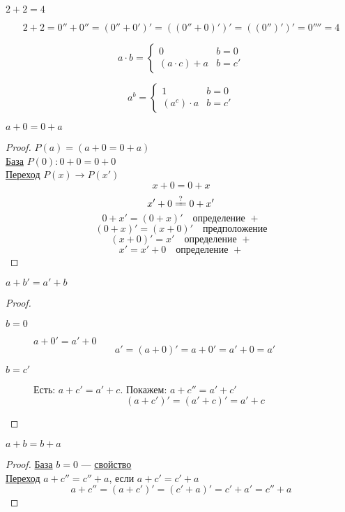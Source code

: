\documentclass[english]{article}
\begin{document}
\begin{task}
	\(2 + 2 = 4\)
\end{task}
\begin{solution}
	\[ 2 + 2 = 0'' + 0'' = (0'' + 0')' = ((0'' + 0)')' = ((0'')')' = 0'''' = 4 \]
\end{solution}
\begin{definition}
	\[ a \cdot b = \begin{cases}
			0               & b = 0  \\
			(a \cdot c) + a & b = c'
		\end{cases}\]
	\label{org75c396e}
\end{definition}
\begin{definition}
	\[ a^b = \begin{cases}
			1            & b = 0  \\
			(a^c)\cdot a & b = c'
		\end{cases}\]
	\label{org937b257}
\end{definition}
\beginproperty
\begin{property}
	\(a + 0 = 0 + a\)
	\label{orgd913f3c}
\end{property}
\begin{proof}
	\(P(a) = (a + 0 = 0 + a)\) \\
	\uline{База} \(P(0): 0 + 0 = 0 + 0\) \\
	\uline{Переход} \(P(x) \to P(x')\)
	\[ x + 0 = 0 + x \]
	\[ x' + 0 \xlongequal{?} 0 + x' \]
	\[ 0 + x' = (0 + x)' \quad\text{определение }+ \]
	\[ (0 + x)' = (x + 0)' \quad\text{предположение} \]
	\[ (x + 0)' = x' \quad\text{определение }+\]
	\[ x' = x' + 0 \quad\text{определение }+ \]
\end{proof}
\begin{property}
	\(a + b' = a' + b\)
\end{property}
\begin{proof}
	\-
	\begin{description}
		\item[{\(b = 0\)}] \(a + 0' = a' + 0\)
			\[ a' = (a + 0)' = a + 0' = a'+0 = a' \]
		\item[{\(b = c'\)}] Есть: \(a + c' = a' + c\). Покажем: \(a + c'' = a' + c'\)
			\[ (a + c')' = (a' + c)' = a' + c \]
	\end{description}
\end{proof}
\begin{property}
	\(a + b = b + a\)
\end{property}
\begin{proof}
	\uline{База} \(b = 0\) --- \hyperref[orgd913f3c]{свойство} \\
	\uline{Переход} \(a + c'' = c'' + a\), если \(a + c' = c' + a\)
	\[ a + c'' = (a + c')' = (c' + a)' = c' + a' = c'' + a\]
\end{proof}
\end{document}
